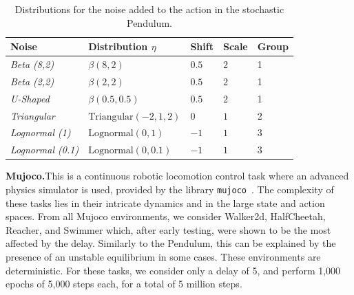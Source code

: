 \begin{table}[t]
\centering
    \begin{tabular}{|l||l|l|l|l|}
        \hline
        Noise & Distribution  $\eta$ & Shift & Scale & Group \\ \hline
        \textit{Beta (8,2)}& $\beta (8,2)$ & $0.5$ & $2$ &  1\\ 
        \textit{Beta (2,2)} & $\beta (2,2)$ & $0.5$ & $2$ & 1\\ 
        \textit{U-Shaped} & $\beta (0.5,0.5)$ & $0.5$ & $2$ & 1\\ 
        \textit{Triangular} & $\text{Triangular} (-2,1,2)$ & $0$ & $1$ & 2\\ 
        \textit{Lognormal (1)} & $\text{Lognormal} (0,1)$ & $-1$ & $1$ & 3\\ 
        \textit{Lognormal (0.1)} & $\text{Lognormal} (0,0.1)$ & $-1$ & $1$ & 3\\ 
        \hline
    \end{tabular}
    \caption{Distributions for the noise added to the action in the stochastic Pendulum.}
    \label{tab:noises}
\end{table}

\noindent\textbf{Mujoco.}\indent This is a continuous robotic locomotion control task where an advanced physics simulator is used, provided by the library \texttt{mujoco}~\cite{todorov2012mujoco}. 
The complexity of these tasks lies in their intricate dynamics and in the large state and action spaces. 
From all Mujoco environments, we consider Walker2d, HalfCheetah, Reacher, and Swimmer which, after early testing, were shown to be the most affected by the delay.
Similarly to the Pendulum, this can be explained by the presence of an unstable equilibrium in some cases. 
These environments are deterministic. 
For these tasks, we consider only a delay of 5, and perform 1,000 epochs of 5,000 steps each, for a total of 5 million steps.


